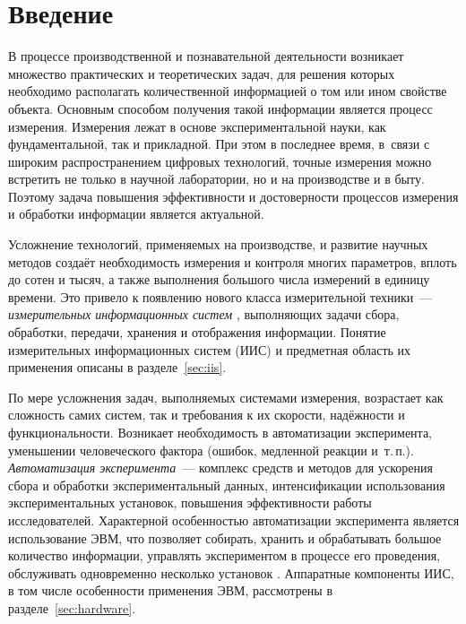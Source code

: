 \documentclass[a4paper, 14pt, titlepage]{extarticle}
\newcommand\sectiontoc[1]{\section*{\centering #1}\addcontentsline{toc}{section}{#1}}
\newcommand{\term}[1]{\emph{#1}}
\let\oldsection\section
\renewcommand{\section}{\newpage\oldsection}
\begin{document}

    \clearpage
    \tableofcontents


  \sectiontoc{Введение}\label{sec:intro}

  В процессе производственной и познавательной деятельности возникает множество практических и
  теоретических задач, для решения которых необходимо располагать количественной информацией о том
  или ином свойстве объекта. Основным способом получения такой информации является процесс измерения.
  Измерения лежат в основе экспериментальной науки, как фундаментальной, так и прикладной. При этом
  в последнее время, в~связи с широким распространением цифровых технологий, точные измерения можно
  встретить не только в научной лаборатории, но и на производстве и в быту.
  Поэтому задача повышения эффективности и достоверности процессов измерения и обработки информации
  является актуальной.

  Усложнение технологий, применяемых на производстве, и развитие научных методов создаёт
  необходимость измерения и контроля многих параметров, вплоть до сотен и тысяч, а также
  выполнения большого числа измерений в единицу времени. Это привело к появлению нового класса
  измерительной техники~--- \term{измерительных информационных систем} \cite{rannev-iis,rannev-meas-tech},
  выполняющих задачи сбора, обработки, передачи, хранения и отображения информации.
  Понятие измерительных информационных систем (ИИС) и предметная область их применения описаны в
  разделе~\ref{sec:iis}.

  По мере усложнения задач, выполняемых системами измерения, возрастает как сложность самих систем,
  так и требования к их скорости, надёжности и функциональности. Возникает необходимость в
  автоматизации эксперимента, уменьшении человеческого фактора (ошибок, медленной реакции и~т.\,п.).
  \term{Автоматизация эксперимента}~--- комплекс
  средств и методов для ускорения сбора и обработки экспериментальный данных, интенсификации
  использования экспериментальных установок, повышения эффективности работы исследователей.
  Характерной особенностью автоматизации эксперимента является использование ЭВМ, что позволяет
  собирать, хранить и обрабатывать большое количество информации, управлять экспериментом в процессе
  его проведения, обслуживать одновременно несколько установок \cite{petronevich-automation,sokolov-auto-measure}.
  Аппаратные компоненты ИИС, в том числе особенности применения ЭВМ, рассмотрены в
  разделе~\ref{sec:hardware}.
\end{document}
